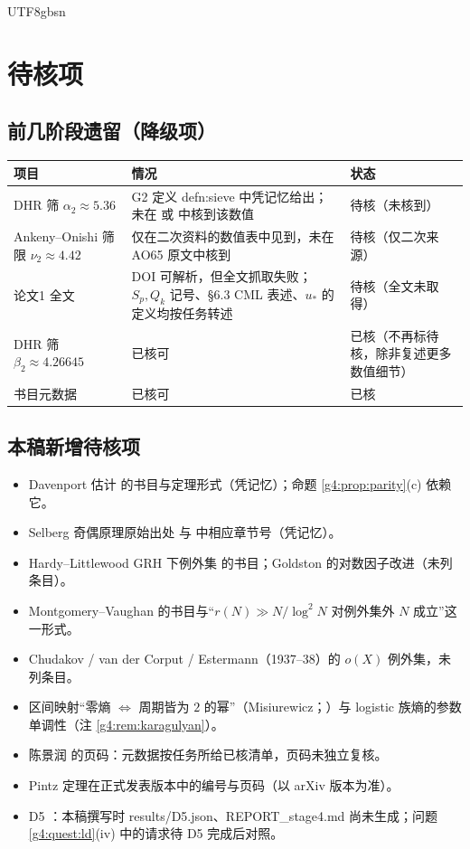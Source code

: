 \documentclass[11pt,a4paper]{article}
\newcommand{\ust}{u_{*}}               %
\theoremstyle{plain}
\theoremstyle{definition}
\begin{document}
\begin{CJK}{UTF8}{gbsn}
\section{待核项}\label{g4:sec:pending}

\subsection*{前几阶段遗留（降级项）}
\begin{center}
\begin{tabular}{p{3.6cm}p{6.6cm}p{4.2cm}}
\hline
项目 & 情况 & 状态\\
\hline
DHR 筛 $\alpha_2\approx5.36$ & G2 定义 defn:sieve 中凭记忆给出；未在 \cite{DHR88} 或 \cite{DH08} 中核到该数值 & 待核（未核到）\\
Ankeny--Onishi 筛限 $\nu_2\approx4.42$ & 仅在二次资料的数值表中见到，未在 AO65 \cite{AO65} 原文中核到 & 待核（仅二次来源）\\
论文1 \cite{Wang26} 全文 & DOI 可解析，但全文抓取失败；$S_p,Q_k$ 记号、\S6.3 CML 表述、$\ust$ 的定义均按任务转述 & 待核（全文未取得）\\
DHR 筛 $\beta_2\approx4.26645$ & 已核可 & 已核（不再标待核，除非复述更多数值细节）\\
\cite{DHR88,Iwa80,AO65} 书目元数据 & 已核可 & 已核\\
\hline
\end{tabular}
\end{center}

\subsection*{本稿新增待核项}
\begin{itemize}[leftmargin=*]
\item Davenport 估计 \cite{Dav37} 的书目与定理形式（凭记忆）；命题 \ref{g4:prop:parity}(c) 依赖它。
\item Selberg 奇偶原理原始出处 \cite{Sel49} 与 \cite{FI10} 中相应章节号（凭记忆）。
\item Hardy--Littlewood GRH 下例外集 \cite{HL24} 的书目；Goldston 的对数因子改进（未列条目）。
\item Montgomery--Vaughan \cite{MV75} 的书目与“$r(N)\gg N/\log^2N$ 对例外集外 $N$ 成立”这一形式。
\item Chudakov / van der Corput / Estermann（1937--38）的 $o(X)$ 例外集，未列条目。
\item 区间映射“零熵 $\iff$ 周期皆为 $2$ 的幂”（Misiurewicz；\cite{BC92}）与 logistic 族熵的参数单调性（注 \ref{g4:rem:karagulyan}）。
\item 陈景润 \cite{Chen73} 的页码：元数据按任务所给已核清单，页码未独立复核。
\item Pintz \cite{Pin18} 定理在正式发表版本中的编号与页码（以 arXiv 版本为准）。
\item D5 \cite{D5}：本稿撰写时 results/D5.json、REPORT\_stage4.md 尚未生成；问题 \ref{g4:quest:ld}(iv) 中的请求待 D5 完成后对照。
\end{itemize}


\end{CJK}
\end{document}

